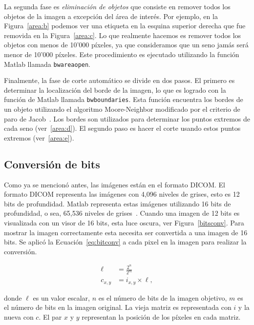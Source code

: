 La segunda fase es \textit{eliminación de objetos} que consiste en remover
todos los objetos de la imagen a excepción del área de interés. Por ejemplo, en
la Figura~\ref{area:b} podemos ver una etiqueta en la esquina superior derecha
que fue removida en la Figura~\ref{area:c}. Lo que realmente hacemos es remover
todos los objetos con menos de 10'000 píxeles, ya que consideramos que un seno
jamás será menor de 10'000 píxeles. Este procedimiento es ejecutado utilizando
la función Matlab llamada \texttt{bwareaopen}.

Finalmente, la fase de corte automático se divide en dos pasos. El primero es
determinar la localización del borde de la imagen, lo que es logrado con la
función de Matlab llamada \texttt{bwboundaries}. Esta función encuentra los
bordes de un objeto utilizando el algoritmo Moore-Neighbor modificado por el
criterio de paro de Jacob~\cite{gonzalez2009digital}. Los bordes son utilizados
para determinar los puntos extremos de cada seno (ver~\ref{area:d}). El segundo
paso es hacer el corte usando estos puntos extremos (ver~\ref{area:e}).

\subsection{Conversión de bits}

Como ya se mencionó antes, las imágenes están en el formato DICOM. El formato
DICOM representa las imágenes con 4,096 niveles de grises, esto es 12 bits de
profundidad. Matlab representa estas imágenes utilizando 16 bits de
profundidad, o sea, 65,536 niveles de grises~\cite{mustra2008efficient}. Cuando
una imagen de 12 bits es visualizada con un visor de 16 bits, esta luce oscura,
ver Figura~\ref{bitsconv}. Para mostrar la imagen correctamente esta necesita ser
convertida a una imagen de 16 bits. Se aplicó la Ecuación~\ref{eq:bitconv} a
cada pixel en la imagen para realizar la conversión.

\begin{equation}
\label{eq:bitconv}
    \begin{split}
            \ell &= \frac{2^{n}}{2^{m}} \\
            c_{x,y} &= i_{x, y} \times \ell,
    \end{split}
\end{equation}

\noindent donde $\ell$ es un valor escalar, $n$ es el número de bits de la imagen
objetivo, $m$ es el número de bits en la imagen original. La vieja matriz es
representada con $i$ y la nueva con $c$. El par $x$ y $y$ representan la
posición de los píxeles en cada matriz.

